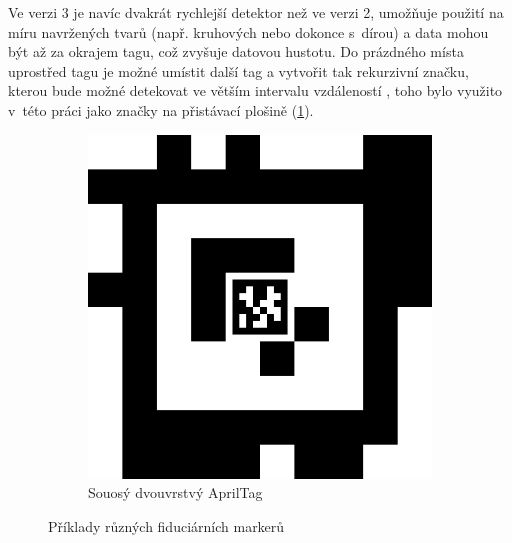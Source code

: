       Ve verzi 3 je navíc dvakrát rychlejší detektor než ve verzi 2, umožňuje použití na míru navržených tvarů (např. kruhových nebo dokonce s~dírou) a data mohou být až za okrajem tagu, což zvyšuje datovou hustotu. Do prázdného místa uprostřed tagu je možné umístit další tag a vytvořit tak rekurzivní značku, kterou bude možné detekovat ve větším intervalu vzdáleností \cite{apriltag3}, toho bylo využito v~této práci jako značky na přistávací plošině (\cref{fig:customAprilTag}).

      \begin{figure}
        \centering
        \begin{subfigure}[b]{0.2\textwidth}
          \includegraphics[width=\textwidth]{img/tag_48_12__36_11_164__137.png}
          \caption{Souosý dvouvrstvý AprilTag}
          \label{fig:customAprilTag}
        \end{subfigure}
        \caption{Příklady různých fiduciárních markerů}
        \label{fig:markery}
      \end{figure}
      